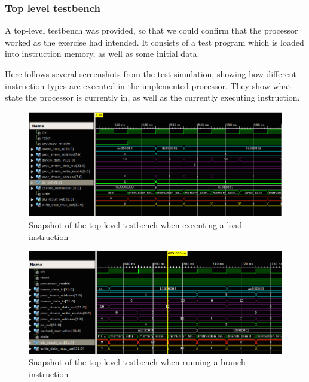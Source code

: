\subsubsection{Top level testbench}

A top-level testbench was provided, so that we could confirm that the processor worked as the exercise had intended.
It consists of a test program which is loaded into instruction memory, as well as some initial data.

Here follows several screenshots from the test simulation, showing how different instruction types are executed in the implemented processor.
They show what state the processor is currently in, as well as the currently executing instruction.

\begin{figure}[ht!]
    \begin{center}
    \includegraphics[width=\textwidth]{assets/isim/memory_read_cycle.png}
    \caption{Snapshot of the top level testbench when executing a load instruction}
    \label{fig:memory_read_cycle}
    \end{center}
\end{figure}

\begin{figure}[ht!]
    \begin{center}
    \includegraphics[width=\textwidth]{assets/isim/branch_completion_cycle.png}
    \caption{Snapshot of the top level testbench when running a branch instruction}
    \label{fig:branch_completion_cycle}
    \end{center}
\end{figure}

